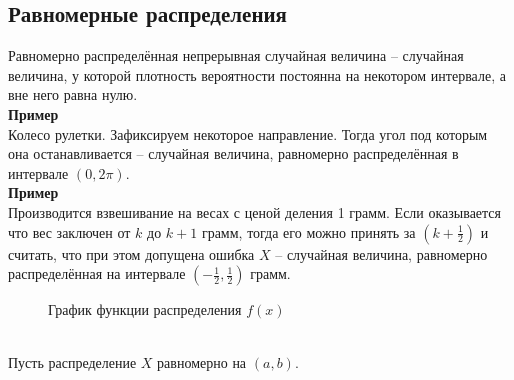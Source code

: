 \documentclass[russian, 12pt, fleqn,x11names]{article}
\begin{document}
\subsection{Равномерные распределения}
\noindent
Равномерно распределённая непрерывная случайная величина -- случайная величина, у которой плотность вероятности постоянна на некотором интервале, а вне него равна нулю.\\
\textbf{Пример\ }\\
Колесо рулетки. Зафиксируем некоторое направление. Тогда угол под которым она останавливается -- случайная величина, равномерно распределённая в интервале $(0, 2\pi)$.\\
\textbf{Пример\ }\\
Производится взвешивание на весах с ценой деления 1 грамм. Если оказывается что вес заключен от $k$ до $k + 1$ грамм, тогда его можно принять за $(k + \frac{1}{2})$ и считать, что при этом допущена ошибка $X$ -- случайная величина, равномерно распределённая на интервале $(-\frac{1}{2}, \frac{1}{2})$ грамм.\\
\begin{figure}[!h]	
\caption{График функции распределения $f(x)$}
\end{figure}\\
Пусть распределение $X$ равномерно на $(a, b)$.\\
\end{document}
